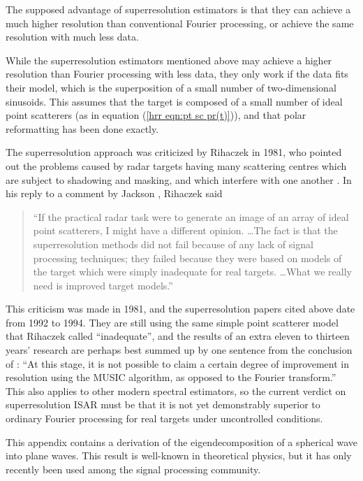 The supposed advantage of superresolution estimators is that they can
achieve a much higher resolution than conventional Fourier processing, or
achieve the same resolution with much less data.  

While the superresolution estimators mentioned above may achieve a higher
resolution than Fourier processing with less data, they only work if the
data fits their model, which is the superposition of a small number of
two-dimensional sinusoids.  This assumes that the target is composed of a
small number of ideal point scatterers (as in equation 
(\ref{hrr eqn:pt sc pr(t)})), and that polar reformatting has been
done exactly. 

The superresolution approach was criticized by Rihaczek in 1981, who pointed out
the problems caused by radar targets having many scattering centres which
are subject to shadowing and masking, and which interfere with one another 
\cite{Rih81a}.  In his reply to a comment by Jackson \cite{Jac81}, Rihaczek 
said \cite{Rih81b} 
\begin{quote}\singlespaced
``If the practical radar task were to generate an image of an array of ideal
point scatterers, I might have a different opinion. \ldots The fact is that
the superresolution methods did not fail because of any lack of signal
processing techniques; they failed because they were based on models of the
target which were simply inadequate for real targets. \ldots What we really
need is improved target models.''  
\end{quote}

This criticism was made in 1981, and the superresolution papers cited above
date from 1992 to 1994.  They are still using the same simple point
scatterer model that Rihaczek  called ``inadequate'', and the results of an
extra eleven to thirteen years' research are perhaps best summed up by one
sentence from the conclusion of \cite{Ode94}: ``At this stage, it is not
possible to claim a certain degree of improvement in resolution using the
MUSIC algorithm, as opposed to the Fourier transform.''  This also applies
to other modern spectral estimators, so the current verdict on 
superresolution ISAR must be that it is not yet demonstrably superior to
ordinary Fourier processing for real targets under uncontrolled conditions.

\label{ii app:pw}

This appendix contains a derivation of the eigendecomposition of a spherical
wave into plane waves.  This result is well-known in theoretical physics, 
but it has only recently been used among the signal processing community.  

